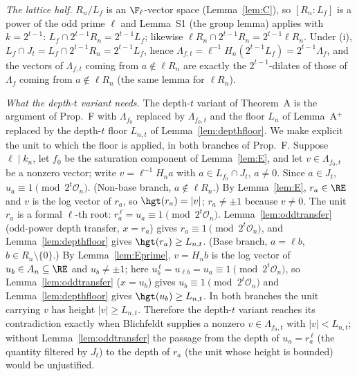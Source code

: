 \emph{The lattice half.} $R_n/L_f$ is an $\F_\ell$-vector space (Lemma~\ref{lem:C}), so $[R_n:L_f]$ is a power of the odd prime $\ell$ and Lemma~S1 (the group lemma) applies with $k=2^{t-1}$: $L_f\cap2^{t-1}R_n=2^{t-1}L_f$; likewise $\ell R_n\cap2^{t-1}R_n=2^{t-1}\ell R_n$. Under (i), $L_f\cap J_t=L_f\cap2^{t-1}R_n=2^{t-1}L_f$, hence $\Lambda_{f,t}=\ell^{-1}H_n(2^{t-1}L_f)=2^{t-1}\Lambda_f$, and the vectors of $\Lambda_{f,t}$ coming from $a\notin\ell R_n$ are exactly the $2^{t-1}$-dilates of those of $\Lambda_f$ coming from $a\notin\ell R_n$ (the same lemma for $\ell R_n$).

\emph{What the depth-$t$ variant needs.} The depth-$t$ variant of Theorem~A is the argument of Prop.~F with $\Lambda_{f_0}$ replaced by $\Lambda_{f_0,t}$ and the floor $L_n$ of Lemma~A$^+$ replaced by the depth-$t$ floor $L_{n,t}$ of Lemma~\ref{lem:depthfloor}. We make explicit the unit to which the floor is applied, in both branches of Prop.~F. Suppose $\ell\mid k_n$, let $f_0$ be the saturation component of Lemma~\ref{lem:E}, and let $v\in\Lambda_{f_0,t}$ be a nonzero vector; write $v=\ell^{-1}H_na$ with $a\in L_{f_0}\cap J_t$, $a\ne0$. Since $a\in J_t$, $u_a\equiv1\pmod{2^t\mathcal O_n}$.
(Non-base branch, $a\notin\ell R_n$.) By Lemma~\ref{lem:E}, $r_a\in\RE$ and $v$ is the log vector of $r_a$, so $\hgt(r_a)=|v|$; $r_a\ne\pm1$ because $v\ne0$. The unit $r_a$ is a formal $\ell$-th root: $r_a^{\,\ell}=u_a\equiv1\pmod{2^t\mathcal O_n}$. Lemma~\ref{lem:oddtransfer} (odd-power depth transfer, $x=r_a$) gives $r_a\equiv1\pmod{2^t\mathcal O_n}$, and Lemma~\ref{lem:depthfloor} gives $\hgt(r_a)\ge L_{n,t}$.
(Base branch, $a=\ell b$, $b\in R_n\setminus\{0\}$.) By Lemma~\ref{lem:Eprime}, $v=H_nb$ is the log vector of $u_b\in A_n\subseteq\RE$ and $u_b\ne\pm1$; here $u_b^{\,\ell}=u_{\ell b}=u_a\equiv1\pmod{2^t\mathcal O_n}$, so Lemma~\ref{lem:oddtransfer} ($x=u_b$) gives $u_b\equiv1\pmod{2^t\mathcal O_n}$ and Lemma~\ref{lem:depthfloor} gives $\hgt(u_b)\ge L_{n,t}$.
In both branches the unit carrying $v$ has height $|v|\ge L_{n,t}$. Therefore the depth-$t$ variant reaches its contradiction exactly when Blichfeldt supplies a nonzero $v\in\Lambda_{f_0,t}$ with $|v|<L_{n,t}$; without Lemma~\ref{lem:oddtransfer} the passage from the depth of $u_a=r_a^{\,\ell}$ (the quantity filtered by $J_t$) to the depth of $r_a$ (the unit whose height is bounded) would be unjustified.

